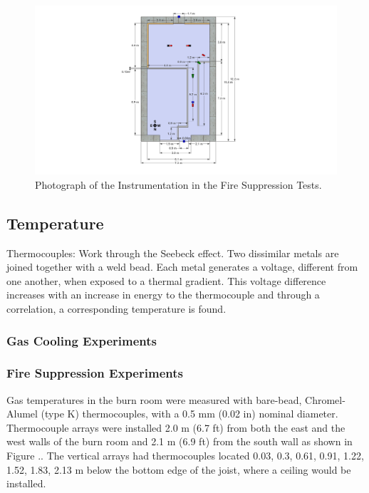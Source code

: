 \documentclass[12pt,oneside]{book}
\begin{document}
\begin{figure}[!ht]
	\includegraphics[width=6in]{../Figures/Pictures/DelCoSingleStoryInstrumentation}
	\caption{Photograph of the Instrumentation in the Fire Suppression Tests.}
	\label{fig:Fire_Suppression_Instrumentation}
\end{figure}

\subsection{Temperature}
\label{subsec:Temperature}

Thermocouples:
Work through the Seebeck effect.  Two dissimilar metals are joined together with a weld bead.  Each metal generates a voltage, different from one another, when exposed to a thermal gradient.  This voltage difference increases with an increase in energy to the thermocouple and through a correlation, a corresponding temperature is found.  

\subsubsection{Gas Cooling Experiments}
\label{subsubsec:Gas_Cooling_Temperature_Instrumentation}

\subsubsection{Fire Suppression Experiments}
\label{subsubsec:Fire_Suppression_Temperature_Instrumentation}

Gas temperatures in the burn room were measured with bare-bead, Chromel-Alumel (type K) thermocouples, with a 0.5 mm (0.02 in) nominal diameter.  Thermocouple arrays were installed 2.0 m (6.7 ft) from both the east and the west walls of the burn room and 2.1 m (6.9 ft) from the south wall as shown in Figure ..  The vertical arrays had thermocouples located 0.03, 0.3, 0.61, 0.91, 1.22, 1.52, 1.83, 2.13 m below the bottom edge of the joist, where a ceiling would be installed.   
\end{document}
